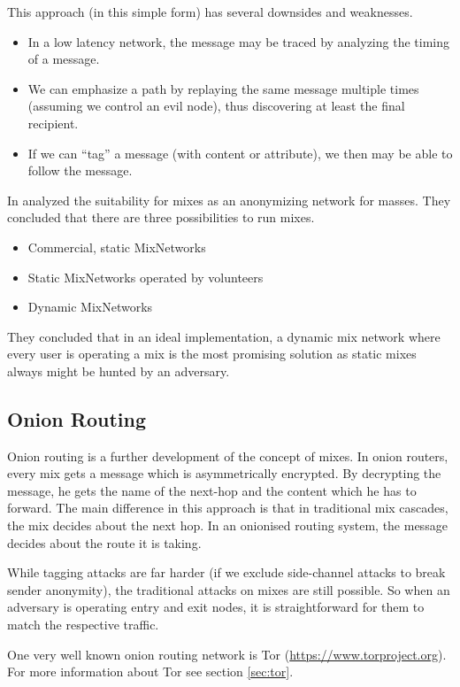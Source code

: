 This approach (in this simple form) has several downsides and weaknesses.

\begin{itemize}
	\item In a low latency network, the message may be traced by analyzing the timing of a message.
	\item We can emphasize a path by replaying the same message multiple times (assuming we control an evil node), thus discovering at least the final recipient.
	\item If we can ``tag'' a message (with content or attribute), we then may be able to follow the message.
\end{itemize}

In \citeyear{RP03-1} \citeauthor{RP03-1} analyzed the suitability for mixes as an anonymizing network for masses. They concluded that there are three possibilities to run mixes.
\begin{itemize}
	\item Commercial, static MixNetworks
	\item Static MixNetworks operated by volunteers
	\item Dynamic MixNetworks
\end{itemize}
They concluded that in an ideal implementation, a dynamic mix network where every user is operating a mix is the most promising solution as static mixes always might be hunted by an adversary.

\subsection{Onion Routing}
Onion routing is a further development of the concept of mixes. In onion routers, every mix gets a message which is asymmetrically encrypted. By decrypting the message, he gets the name of the next-hop and the content which he has to forward. The main difference in this approach is that in traditional mix cascades, the mix decides about the next hop. In an onionised routing system, the message decides about the route it is taking. 

While tagging attacks are far harder (if we exclude side-channel attacks to break sender anonymity), the traditional attacks on mixes are still possible. So when an adversary is operating entry and exit nodes, it is straightforward for them to match the respective traffic.

One very well known onion routing network is Tor (\href{https://www.torproject.org}{https://www.torproject.org}). For more information about Tor see section \ref{sec:tor}.

